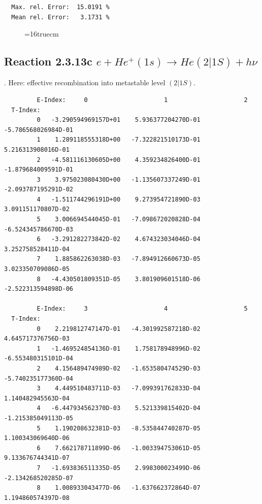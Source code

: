 \documentclass[12pt,dvips]{article}
\begin{document}
\begin{small}
\begin{verbatim}
  Max. rel. Error:  15.0191 %
  Mean rel. Error:   3.1731 %

\end{verbatim}\end{small}
\begin{figure} \label{2.3.13b}
\epsfxsize=16truecm
\end{figure}
\newpage

\subsection{
Reaction 2.3.13c $ e + He^+(1s) \rightarrow He(2|1S) + h\nu$
}

\cite{kn:Fujimoto}. Here: effective recombination into metastable level
$(2|1S)$.

\begin{small}\begin{verbatim}
         E-Index:     0                     1                     2
  T-Index:
         0   -3.290594969157D+01    5.936377204270D-01   -5.786568026984D-01
         1    1.289118555318D+00   -7.322821510173D-01    5.216313908016D-01
         2   -4.581116130605D+00    4.359234826400D-01   -1.879684009591D-01
         3    3.975023080430D+00   -1.135607337249D-01   -2.093787195291D-02
         4   -1.511744296191D+00    9.273954721890D-03    3.091151170807D-02
         5    3.006694544045D-01   -7.098672020828D-04   -6.524345786670D-03
         6   -3.291282273842D-02    4.674323034046D-04    3.252758528411D-04
         7    1.885862263038D-03   -7.894912660673D-05    3.023350709086D-05
         8   -4.430501809351D-05    3.801909601518D-06   -2.522313594898D-06

         E-Index:     3                     4                     5
  T-Index:
         0    2.219812747147D-01   -4.301992587218D-02    4.645717376756D-03
         1   -1.469524854136D-01    1.758178948996D-02   -6.553480315101D-04
         2    4.156489474989D-02   -1.653580474529D-03   -5.740235177360D-04
         3    4.449510483711D-03   -7.099391762833D-04    1.140482945563D-04
         4   -6.447934562370D-03    5.521339815402D-04   -1.215385049113D-05
         5    1.190208632381D-03   -8.535844740287D-05    1.100343069640D-06
         6    7.662178711899D-06   -1.003394753061D-05    9.133676744341D-07
         7   -1.693836511335D-05    2.998300023499D-06   -2.134268520285D-07
         8    1.008933043477D-06   -1.637662372864D-07    1.194860574397D-08


\end{verbatim}
\end{small}
\end{document}
